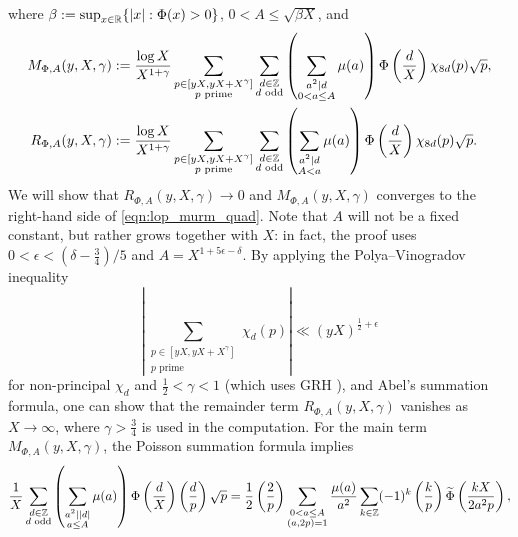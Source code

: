 where $\beta := \sup_{x \in \mathbb{R}}\{|x|: \Phi(x) > 0\}$, $0 < A \le \sqrt{\beta X}$, and
\begin{align}
    M_{\Phi, A}(y, X, \gamma) &:= \frac{\log X}{X^{1 + \gamma}} \sum_{\substack{p \in [yX, yX + X^\gamma] \\ p \text{ prime}}} \sum_{\substack{d \in \mathbb{Z} \\ d \text{ odd}}} \left(\sum_{\substack{a^2 \mid d \\ 0 < a \le A}}\mu(a)\right) \Phi\left(\frac{d}{X}\right) \chi_{8d}(p) \sqrt{p}, \label{eqn:MA} \\
    R_{\Phi, A}(y, X, \gamma) &:= \frac{\log X}{X^{1 + \gamma}} \sum_{\substack{p \in [yX, yX + X^\gamma] \\ p \text{ prime}}} \sum_{\substack{d \in \mathbb{Z} \\ d \text{ odd}}} \left(\sum_{\substack{a^2 \mid d \\ A < a}}\mu(a)\right) \Phi\left(\frac{d}{X}\right) \chi_{8d}(p) \sqrt{p}. \label{eqn:RA}
\end{align}
We will show that $R_{\Phi, A}(y, X, \gamma) \to 0$ and $M_{\Phi, A}(y, X, \gamma)$ converges to the right-hand side of \eqref{eqn:lop_murm_quad}.
Note that $A$ will not be a fixed constant, but rather grows together with $X$: in fact, the proof uses $0 < \epsilon < (\delta - \frac{3}{4}) / 5$ and $A = X^{1 + 5 \epsilon - \delta}$.
By applying the Polya--Vinogradov inequality
\begin{equation}
    \label{eqn:pv}
    \left|\sum_{\substack{p \in [yX, yX + X^\gamma] \\ p\text{ prime}}} \chi_d(p)\right| \ll (yX)^{\frac{1}{2} + \epsilon}
\end{equation}
for non-principal $\chi_d$ and $\frac{1}{2} < \gamma < 1$ (which uses GRH \cite{granville2007large}), and Abel's summation formula, one can show that the remainder term $R_{\Phi, A}(y, X, \gamma)$ vanishes as $X \to \infty$, where $\gamma > \frac{3}{4}$ is used in the computation.
For the main term $M_{\Phi, A}(y, X, \gamma)$, the Poisson summation formula implies \cite[Lemma 2.11]{lee2025murmurations}
\[
\frac{1}{X} \sum_{\substack{d \in \mathbb{Z} \\ d \text{ odd}}} \left(\sum_{\substack{a^2 \mid |d| \\ a \le A}} \mu(a)\right) \Phi\left(\frac{d}{X}\right) \left(\frac{d}{p}\right) \sqrt{p} = \frac{1}{2} \left(\frac{2}{p}\right) \sum_{\substack{0 < a \le A \\ (a, 2p) = 1}} \frac{\mu(a)}{a^2} \sum_{k \in \mathbb{Z}} (-1)^k \left(\frac{k}{p}\right) \widetilde{\Phi} \left(\frac{k X}{2 a^2 p}\right),
\]
